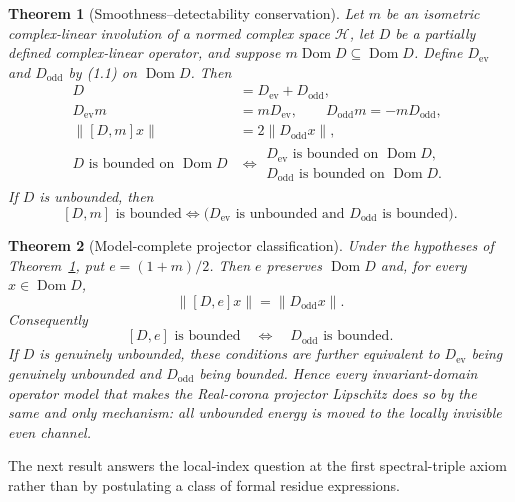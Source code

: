 \documentclass[11pt,reqno]{amsart}
\newtheorem{theorem}{Theorem}[section]
\newcommand{\Dom}{\operatorname{Dom}}
\newcommand{\cH}{\mathcal H}
\begin{document}
\begin{theorem}[Smoothness--detectability conservation]\label{thm:conservation}
Let $m$ be an isometric complex-linear involution of a normed complex space $\cH$, let $D$ be a
partially defined complex-linear operator, and suppose $m\Dom D\subseteq\Dom D$.  Define
$D_{\mathrm{ev}}$ and $D_{\mathrm{odd}}$ by \textup{(1.1)} on $\Dom D$.  Then
\begin{align*}
 D&=D_{\mathrm{ev}}+D_{\mathrm{odd}},\\
 D_{\mathrm{ev}}m&=mD_{\mathrm{ev}},\qquad
 D_{\mathrm{odd}}m=-mD_{\mathrm{odd}},\tag{1.7}\\
 \|[D,m]x\|&=2\|D_{\mathrm{odd}}x\|,\tag{1.8}\\
 D\text{ is bounded on }\Dom D
 &\Longleftrightarrow
 \begin{gathered}
 D_{\mathrm{ev}}\text{ is bounded on }\Dom D,\\[-1mm]
 D_{\mathrm{odd}}\text{ is bounded on }\Dom D.
 \end{gathered}                                      \tag{1.9}
\end{align*}
If $D$ is unbounded, then
\[
 [D,m]\text{ is bounded}
 \Longleftrightarrow
 \bigl(D_{\mathrm{ev}}\text{ is unbounded and }
       D_{\mathrm{odd}}\text{ is bounded}\bigr).     \tag{1.10}
\]
\end{theorem}

\begin{theorem}[Model-complete projector classification]\label{thm:projectorcomplete}
Under the hypotheses of Theorem~\ref{thm:conservation}, put $e=(1+m)/2$.  Then $e$ preserves
$\Dom D$ and, for every $x\in\Dom D$,
\[
                  \|[D,e]x\|=\|D_{\mathrm{odd}}x\|. \tag{1.11}
\]
Consequently
\[
 [D,e]\text{ is bounded}\quad\Longleftrightarrow\quad
 D_{\mathrm{odd}}\text{ is bounded}.                \tag{1.12}
\]
If $D$ is genuinely unbounded, these conditions are further equivalent to
$D_{\mathrm{ev}}$ being genuinely unbounded and $D_{\mathrm{odd}}$ being bounded.  Hence every
invariant-domain operator model that makes the Real-corona projector Lipschitz does so by the
same and only mechanism: all unbounded energy is moved to the locally invisible even channel.
\end{theorem}

The next result answers the local-index question at the first spectral-triple axiom rather than by
postulating a class of formal residue expressions.
\end{document}
